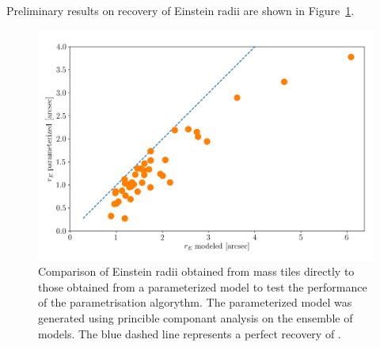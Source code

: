 Preliminary results on recovery of Einstein radii are shown in
Figure~\ref{fig:parameter}.

\begin{figure}
  \includegraphics[width=\linewidth]{img/rE_comp/rE_comp.png}
  \caption{
    Comparison of Einstein radii \ER obtained from mass tiles directly to those obtained from a parameterized model to test the performance of the parametrisation algorythm.
    The parameterized model was generated using princible componant analysis on the ensemble of models.
    The blue dashed line represents a perfect recovery of \ER.
    }
  \label{fig:parameter}
\end{figure}



